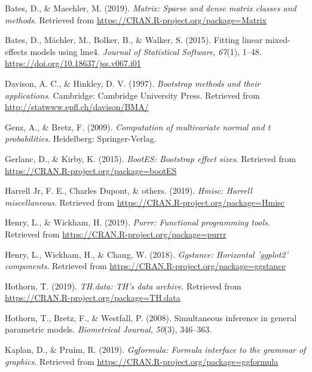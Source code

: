 \documentclass[man]{apa6}
\begin{document}
\leavevmode\hypertarget{ref-R-Matrix}{}%
Bates, D., \& Maechler, M. (2019). \emph{Matrix: Sparse and dense matrix classes and methods}. Retrieved from \url{https://CRAN.R-project.org/package=Matrix}

\leavevmode\hypertarget{ref-R-lme4}{}%
Bates, D., Mächler, M., Bolker, B., \& Walker, S. (2015). Fitting linear mixed-effects models using lme4. \emph{Journal of Statistical Software}, \emph{67}(1), 1--48. \url{https://doi.org/10.18637/jss.v067.i01}

\leavevmode\hypertarget{ref-R-boot}{}%
Davison, A. C., \& Hinkley, D. V. (1997). \emph{Bootstrap methods and their applications}. Cambridge: Cambridge University Press. Retrieved from \url{http://statwww.epfl.ch/davison/BMA/}

\leavevmode\hypertarget{ref-R-mvtnorm}{}%
Genz, A., \& Bretz, F. (2009). \emph{Computation of multivariate normal and t probabilities}. Heidelberg: Springer-Verlag.

\leavevmode\hypertarget{ref-R-bootES}{}%
Gerlanc, D., \& Kirby, K. (2015). \emph{BootES: Bootstrap effect sizes}. Retrieved from \url{https://CRAN.R-project.org/package=bootES}

\leavevmode\hypertarget{ref-R-Hmisc}{}%
Harrell Jr, F. E., Charles Dupont, \& others. (2019). \emph{Hmisc: Harrell miscellaneous}. Retrieved from \url{https://CRAN.R-project.org/package=Hmisc}

\leavevmode\hypertarget{ref-R-purrr}{}%
Henry, L., \& Wickham, H. (2019). \emph{Purrr: Functional programming tools}. Retrieved from \url{https://CRAN.R-project.org/package=purrr}

\leavevmode\hypertarget{ref-R-ggstance}{}%
Henry, L., Wickham, H., \& Chang, W. (2018). \emph{Ggstance: Horizontal 'ggplot2' components}. Retrieved from \url{https://CRAN.R-project.org/package=ggstance}

\leavevmode\hypertarget{ref-R-TH.data}{}%
Hothorn, T. (2019). \emph{TH.data: TH's data archive}. Retrieved from \url{https://CRAN.R-project.org/package=TH.data}

\leavevmode\hypertarget{ref-R-multcomp}{}%
Hothorn, T., Bretz, F., \& Westfall, P. (2008). Simultaneous inference in general parametric models. \emph{Biometrical Journal}, \emph{50}(3), 346--363.

\leavevmode\hypertarget{ref-R-ggformula}{}%
Kaplan, D., \& Pruim, R. (2019). \emph{Ggformula: Formula interface to the grammar of graphics}. Retrieved from \url{https://CRAN.R-project.org/package=ggformula}
\end{document}
